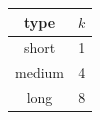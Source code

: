 \begin{tabular}{cc}
\toprule
type & $k$ \\
\midrule
short & 1 \\
medium & 4 \\
long & 8 \\
\bottomrule
\end{tabular}
